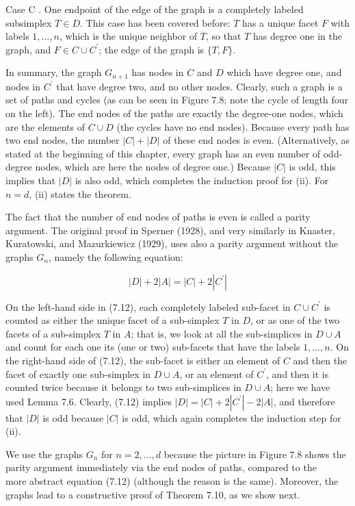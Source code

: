 \documentclass[12pt]{article}
\begin{document}
Case C . One endpoint of the edge of the graph is a completely labeled subsimplex $T \in D$. This case has been covered before: $T$ has a unique facet $F$ with labels $1, \ldots, n$, which is the unique neighbor of $T$, so that $T$ has degree one in the graph, and $F \in C \cup C^{\prime}$; the edge of the graph is $\{T, F\}$.

In summary, the graph $G_{n+1}$ has nodes in $C$ and $D$ which have degree one, and nodes in $C^{\prime}$ that have degree two, and no other nodes. Clearly, such a graph is a set of paths and cycles (as can be seen in Figure 7.8; note the cycle of length four on the left). The end nodes of the paths are exactly the degree-one nodes, which are the elements of $C \cup D$ (the cycles have no end nodes). Because every path has two end nodes, the number $|C|+|D|$ of these end nodes is even. (Alternatively, as stated at the beginning of this chapter, every graph has an even number of odd-degree nodes, which are here the nodes of degree one.) Because $|C|$ is odd, this implies that $|D|$ is also odd, which completes the induction proof for (ii). For $n=d$, (ii) states the theorem.

The fact that the number of end nodes of paths is even is called a parity argument. The original proof in Sperner (1928), and very similarly in Knaster, Kuratowski, and Mazurkiewicz (1929), uses also a parity argument without the graphs $G_{n}$, namely the following equation:


\begin{equation*}
|D|+2|A|=|C|+2\left|C^{\prime}\right| \tag{7.12}
\end{equation*}


On the left-hand side in (7.12), each completely labeled sub-facet in $C \cup C^{\prime}$ is counted as either the unique facet of a sub-simplex $T$ in $D$, or as one of the two facets of a sub-simplex $T$ in $A$; that is, we look at all the sub-simplices in $D \cup A$ and count for each one its (one or two) sub-facets that have the labels $1, \ldots, n$. On the right-hand side of (7.12), the sub-facet is either an element of $C$ and then the facet of exactly one sub-simplex in $D \cup A$, or an element of $C^{\prime}$, and then it is counted twice because it belongs to two sub-simplices in $D \cup A$; here we have used Lemma 7.6. Clearly, (7.12) implies $|D|=|C|+2\left|C^{\prime}\right|-2|A|$, and therefore that $|D|$ is odd because $|C|$ is odd, which again completes the induction step for (ii).

We use the graphs $G_{n}$ for $n=2, \ldots, d$ because the picture in Figure 7.8 shows the parity argument immediately via the end nodes of paths, compared to the\\
more abstract equation (7.12) (although the reason is the same). Moreover, the graphs lead to a constructive proof of Theorem 7.10, as we show next.
\end{document}
